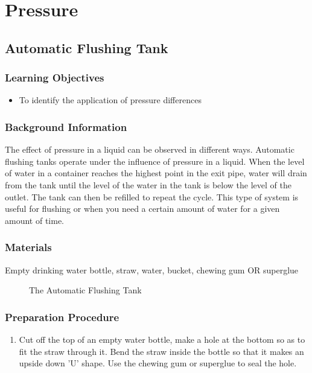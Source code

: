 \section{Pressure}

\subsection{Automatic Flushing Tank}

\subsubsection*{Learning Objectives}
\begin{itemize}
\item{To identify the application of pressure differences}
\end{itemize}

\subsubsection*{Background Information}
The effect of pressure in a liquid can be observed in different ways. Automatic flushing tanks operate under the influence of pressure in a liquid. When the level of water in a container reaches the highest point in the exit pipe, water will drain from the tank until the level of the water in the tank is below the level of the outlet. The tank can then be refilled to repeat the cycle. This type of system is useful for flushing or when you need a certain amount of water for a given amount of time.

\subsubsection*{Materials}
Empty drinking water bottle, straw, water, bucket, chewing gum OR superglue

\begin{figure}
\begin{center}
\def\svgwidth{150pt}

\caption{The Automatic Flushing Tank}
\label{fig:auto-flushing-tank}
\end{center}
\end{figure}

\subsubsection*{Preparation Procedure}
\begin{enumerate}
\item{Cut off the top of an empty water bottle, make a hole at the bottom so as to fit the straw through it. 
Bend the straw inside the bottle so that it makes an upside down 'U' shape. Use the chewing gum or superglue to seal the hole.} 
\end{enumerate}

